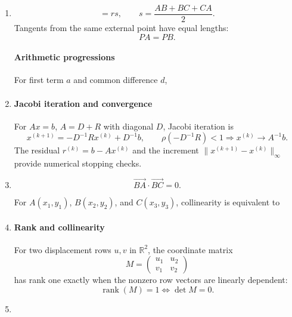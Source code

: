 \begin{enumerate}[leftmargin=0pt,itemsep=6pt]
For a triangle with inradius $r$ and semiperimeter $s$,
\addtocounter{enumi}{1}
\item
\begin{equation}
[ABC]=rs,\qquad s=\frac{AB+BC+CA}{2}.
\label{eq:triangle-inradius}
\end{equation}
Tangents from the same external point have equal lengths:
\begin{equation}
PA=PB.\label{eq:equal-tangents}
\end{equation}

\paragraph*{Arithmetic progressions}
For first term $a$ and common difference $d$,

\addtocounter{enumi}{1}
\item
\paragraph*{Jacobi iteration and convergence}
For $Ax=b$, $A=D+R$ with diagonal $D$, Jacobi iteration is
\begin{equation}
x^{(k+1)}=-D^{-1}Rx^{(k)}+D^{-1}b,\qquad
\rho(-D^{-1}R)<1\Longrightarrow x^{(k)}\to A^{-1}b.
\label{eq:jacobi-08}
\end{equation}
The residual $r^{(k)}=b-Ax^{(k)}$ and the increment
$\|x^{(k+1)}-x^{(k)}\|_\infty$ provide numerical stopping checks.
\item
\begin{equation}
\overrightarrow{BA}\cdot\overrightarrow{BC}=0.\label{eq:right-angle-dot}
\end{equation}

For $A(x_1,y_1)$, $B(x_2,y_2)$, and $C(x_3,y_3)$, collinearity is equivalent to

\item
\paragraph*{Rank and collinearity}
For two displacement rows $u,v$ in $\mathbb R^2$, the coordinate matrix
\[
M=\begin{pmatrix}u_1&u_2\\v_1&v_2\end{pmatrix}
\]
has rank one exactly when the nonzero row vectors are linearly dependent:
\begin{equation}
\operatorname{rank}(M)=1\iff\det M=0.
\label{eq:collinear-det}
\end{equation}
\item

\end{enumerate}

